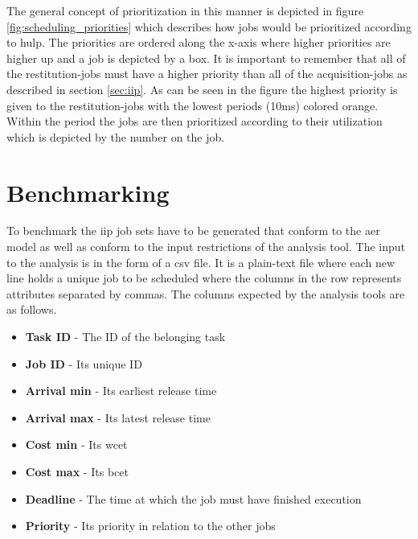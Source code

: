 \documentclass{kththesis}
\begin{document}
The general concept of prioritization in this manner is depicted in figure
\ref{fig:scheduling_priorities} which describes how jobs would be prioritized according to
\acrshort{hulp}. The priorities are ordered along the x-axis where higher priorities are higher up
and a job is depicted by a box.
It is important to remember that all of the restitution-jobs must have a higher priority than all of
the acquisition-jobs as described in section \ref{sec:iip}. As can be seen in the figure the highest
priority is given to the restitution-jobs with the lowest periods (10ms) colored orange. Within the
period the jobs are then prioritized according to their utilization which is depicted by the number
on the job. 




\section{Benchmarking}\label{sec:benchmarking}

To benchmark the \acrshort{iip} job sets have to be generated that conform to
the \acrshort{aer} model as well as conform to the input restrictions of the
analysis tool. The input to the analysis is in the form of a \acrfull{csv}
file. It is a plain-text file where each new line holds a unique job to be
scheduled where the columns in the row represents attributes separated by
commas. The columns expected by the analysis tools are as follows.

\begin{itemize}
    \item \textbf{Task ID} - The ID of the belonging task
    \item \textbf{Job ID} - Its unique ID
    \item \textbf{Arrival min} - Its earliest release time
    \item \textbf{Arrival max} - Its latest release time
    \item \textbf{Cost min} - Its \acrshort{wcet}
    \item \textbf{Cost max} - Its \acrshort{bcet}
    \item \textbf{Deadline} - The time at which the job must have finished execution
    \item \textbf{Priority} - Its priority in relation to the other jobs
\end{itemize}
\end{document}
